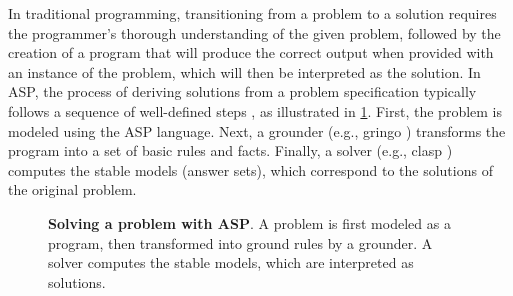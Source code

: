 \documentclass[11pt,leqno]{amsart}
\begin{document}
In traditional programming, transitioning from a problem to a solution 
requires the programmer's thorough understanding of the given problem, 
followed by the creation of a program that will produce the correct output 
when provided with an instance of the problem, which will then be interpreted as the solution. 
In ASP, the process of deriving solutions from a problem specification 
typically follows a sequence of well-defined steps \cite{Gebser2013}, 
as illustrated in \cref{fig:asp-solving}. 
First, the problem is modeled using the ASP language. 
Next, a grounder (e.g., gringo \cite{Gebser2014}) transforms the program into a set of basic rules and facts. 
Finally, a solver (e.g., clasp \cite{Holldobler2014}) computes the stable models (answer sets), 
which correspond to the solutions of the original problem.

\begin{figure}[t]
    \begin{center}
    \end{center}
		\caption{\textbf{Solving a problem with ASP}. A problem is first modeled as a program, then transformed into ground rules by a grounder. A solver computes the stable models, which are interpreted as solutions.}
    \label{fig:asp-solving}
\end{figure}
\end{document}
